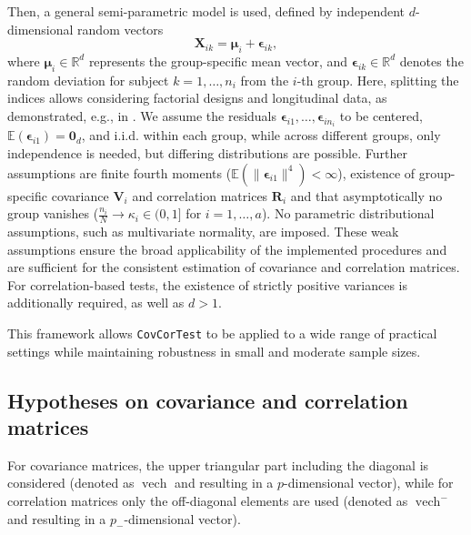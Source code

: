 Then, a general semi-parametric model is used, defined by independent
\(d\)-dimensional random vectors
\begin{equation}
\boldsymbol{X}_{ik}
= \boldsymbol{\mu}_i + \boldsymbol{\epsilon}_{ik},
\label{eq:model}
\end{equation}
where \(\boldsymbol{\mu}_i \in \mathbb{R}^d\) represents the group-specific mean
vector, and \(\boldsymbol{\epsilon}_{ik} \in \mathbb{R}^d\) denotes the random
deviation for subject \(k = 1, \dots, n_i\) from the \(i\)-th group. Here, splitting
the indices allows considering factorial designs and longitudinal data, as
demonstrated, e.g., in \citet{pauly2015}. We assume the residuals
\(\boldsymbol{\epsilon}_{i1}, \dots, \boldsymbol{\epsilon}_{in_i}\)
to be centered,
\(\mathbb{E}(\boldsymbol{\epsilon}_{i1}) = \mathbf{0}_d\), and i.i.d. within each group, while
across different groups, only independence is needed, but differing
distributions are possible. Further assumptions are finite fourth moments
(\(\mathbb{E}(\lVert \boldsymbol{\epsilon}_{i1} \rVert^4) < \infty\)), existence of
group-specific covariance \(\boldsymbol{V}_i\) and correlation matrices \(\boldsymbol{R}_i\) and that
asymptotically no group vanishes
(\(\frac{n_i}{N} \longrightarrow\kappa_i \in (0,1]\) for \(i = 1, \dots, a\)). No parametric
distributional assumptions, such as multivariate normality, are
imposed. These weak assumptions ensure the broad applicability of the
implemented procedures and are sufficient for the consistent estimation of
covariance and correlation matrices. For correlation-based tests, the existence
of strictly positive variances is additionally required, as well as \(d > 1\).

This framework allows \texttt{CovCorTest} to be applied to a wide range of
practical settings while maintaining robustness in small and moderate sample
sizes.

\subsection{Hypotheses on covariance and correlation matrices}\label{hypotheses-on-covariance-and-correlation-matrices}

For covariance matrices, the upper triangular part including the diagonal is
considered (denoted as \(\operatorname{vech}\) and resulting in a \(p\)-dimensional vector), while
for correlation matrices only the off-diagonal elements are used (denoted as
\(\operatorname{vech}^{-}\) and resulting in a \(p_{-}\)-dimensional vector).

